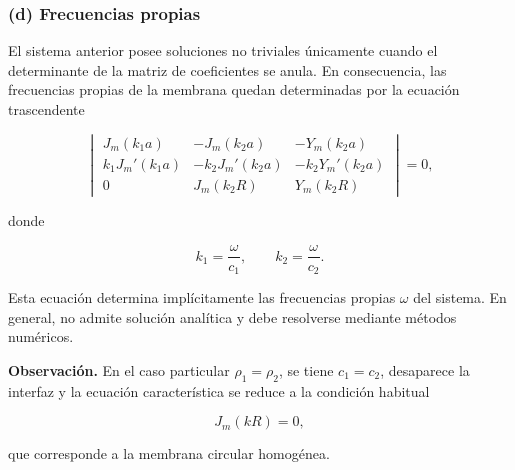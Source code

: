 \documentclass[12pt]{article}
\begin{document}
\subsubsection*{(d) Frecuencias propias}

El sistema anterior posee soluciones no triviales únicamente cuando el determinante de la matriz de coeficientes se anula. En consecuencia, las frecuencias propias de la membrana quedan determinadas por la ecuación trascendente

\begin{equation}
\boxed{
\begin{vmatrix}
J_m(k_1a)
&
-J_m(k_2a)
&
-Y_m(k_2a)
\\[2mm]
k_1J_m'(k_1a)
&
-k_2J_m'(k_2a)
&
-k_2Y_m'(k_2a)
\\[2mm]
0
&
J_m(k_2R)
&
Y_m(k_2R)
\end{vmatrix}
=0,
}
\end{equation}

donde

\[
k_1=\frac{\omega}{c_1},
\qquad
k_2=\frac{\omega}{c_2}.
\]

Esta ecuación determina implícitamente las frecuencias propias $\omega$ del sistema. En general, no admite solución analítica y debe resolverse mediante métodos numéricos.

\bigskip

\noindent
\textbf{Observación.} En el caso particular $\rho_1=\rho_2$, se tiene $c_1=c_2$, desaparece la interfaz y la ecuación característica se reduce a la condición habitual

\[
J_m(kR)=0,
\]

que corresponde a la membrana circular homogénea.
\end{document}
